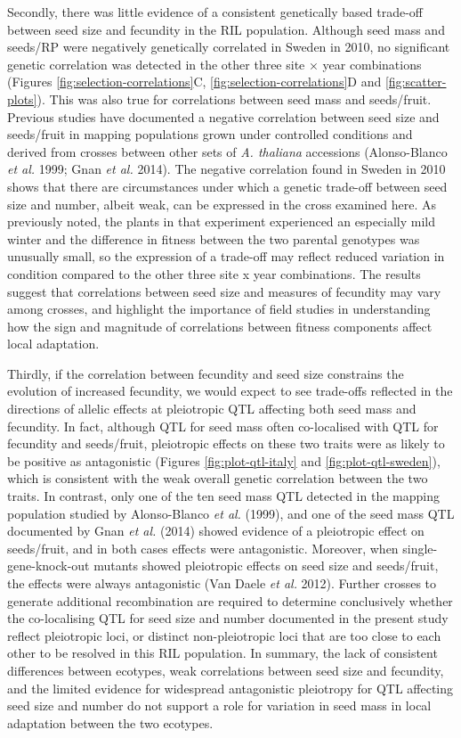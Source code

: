 \documentclass[]{article}
\begin{document}
Secondly, there was little evidence of a consistent genetically based trade-off between seed size and fecundity in the RIL population. Although seed mass and seeds/RP were negatively genetically correlated in Sweden in 2010, no significant genetic correlation was detected in the other three site × year combinations (Figures \ref{fig:selection-correlations}C, \ref{fig:selection-correlations}D and \ref{fig:scatter-plots}). This was also true for correlations between seed mass and seeds/fruit. Previous studies have documented a negative correlation between seed size and seeds/fruit in mapping populations grown under controlled conditions and derived from crosses between other sets of \emph{A. thaliana} accessions (Alonso-Blanco \emph{et al.} 1999; Gnan \emph{et al.} 2014). The negative correlation found in Sweden in 2010 shows that there are circumstances under which a genetic trade-off between seed size and number, albeit weak, can be expressed in the cross examined here. As previously noted, the plants in that experiment experienced an especially mild winter and the difference in fitness between the two parental genotypes was unusually small, so the expression of a trade-off may reflect reduced variation in condition compared to the other three site x year combinations. The results suggest that correlations between seed size and measures of fecundity may vary among crosses, and highlight the importance of field studies in understanding how the sign and magnitude of correlations between fitness components affect local adaptation.

Thirdly, if the correlation between fecundity and seed size constrains the evolution of increased fecundity, we would expect to see trade-offs reflected in the directions of allelic effects at pleiotropic QTL affecting both seed mass and fecundity. In fact, although QTL for seed mass often co-localised with QTL for fecundity and seeds/fruit, pleiotropic effects on these two traits were as likely to be positive as antagonistic (Figures \ref{fig:plot-qtl-italy} and \ref{fig:plot-qtl-sweden}), which is consistent with the weak overall genetic correlation between the two traits. In contrast, only one of the ten seed mass QTL detected in the mapping population studied by Alonso-Blanco \emph{et al.} (1999), and one of the seed mass QTL documented by Gnan \emph{et al.} (2014) showed evidence of a pleiotropic effect on seeds/fruit, and in both cases effects were antagonistic. Moreover, when single-gene-knock-out mutants showed pleiotropic effects on seed size and seeds/fruit, the effects were always antagonistic (Van Daele \emph{et al.} 2012). Further crosses to generate additional recombination are required to determine conclusively whether the co-localising QTL for seed size and number documented in the present study reflect pleiotropic loci, or distinct non-pleiotropic loci that are too close to each other to be resolved in this RIL population. In summary, the lack of consistent differences between ecotypes, weak correlations between seed size and fecundity, and the limited evidence for widespread antagonistic pleiotropy for QTL affecting seed size and number do not support a role for variation in seed mass in local adaptation between the two ecotypes.
\end{document}
